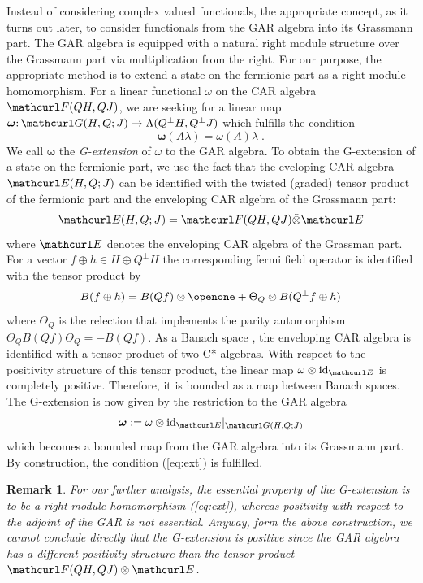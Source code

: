 \documentclass[pra,twoside,amsmath,amsfonts,amssymb,superscriptaddress,showpacs]{revtex4}
\newtheorem{rem}[thm]{Remark}
\def\8#1{{\rm #1}}
\def\9#1{{\mathcurl #1}}
\def\bS#1{{\boldsymbol #1}}
\def\I{\openone}
\newcommand{\CAR}[2]{\9F(#1,#2)}
\newcommand{\GR}[2]{\Lambda(#1,#2)}
\newcommand{\GAR}[3]{\9G(#1,#3;#2)}
\newcommand{\ENV}[3]{\9E(#1,#3;#2)}
\begin{document}
Instead of considering complex valued 
functionals, the appropriate concept, as it turns out later,
to consider functionals from the GAR algebra into its Grassmann part. The GAR
algebra is equipped with a natural right module structure over the Grassmann part via multiplication
from the right. For our purpose, the appropriate method is to extend a state on the fermionic part
as a right module homomorphism. For a linear functional $\omega$ on the CAR algebra $\CAR{QH}{QJ}$,
we are seeking for a linear map $\bS\omega\mathpunct:\GAR{H}{J}{Q}\to\GR{Q^\perp H}{Q^\perp J}$
which fulfills the condition
\begin{equation}
\label{eq:ext}
\bS\omega(A\lambda)=\omega(A)\lambda \; .
\end{equation}
We call $\bS\omega$ the {\em G-extension} of $\omega$ to the GAR algebra. To obtain the
G-extension of a state on the fermionic part, we use the fact that the eveloping CAR algebra
$\ENV{H}{J}{Q}$ can be identified with the twisted (graded) tensor product of the fermionic part and
the enveloping CAR algebra of the Grassmann part:
\begin{equation}
\ENV{H}{J}{Q}=\CAR{QH}{QJ}\tilde\otimes\9E
\end{equation}
where $\9E$ denotes the enveloping CAR algebra of the Grassman part. For a vector
$f\oplus h\in H\oplus Q^\perp H$ the corresponding fermi field operator is identified with the
tensor product by
\begin{equation}
B(f\oplus h )=B(Qf)\otimes\I +\Theta_Q\otimes B(Q^\perp f\oplus h)
\end{equation}
where $\Theta_Q$ is the relection that implements the parity automorphism $\Theta_Q
B(Qf)\Theta_Q=-B(Qf)$. As a Banach space , the enveloping CAR algebra is identified with a tensor
product of two C*-algebras. With respect to the positivity structure of this tensor product, the
linear map $\omega\otimes \8{id}_\9E$ is completely positive. Therefore, it is bounded as a map
between Banach spaces. The G-extension is now given by the restriction to the GAR algebra
\begin{equation}
\bS\omega:=\omega\otimes\8{id}_\9E|_{\GAR{H}{J}{Q}}
\end{equation}
which becomes a bounded map from the GAR algebra into its Grassmann part. By construction, the 
condition (\ref{eq:ext}) is fulfilled.

\begin{rem}\em
For our further analysis, the essential property of the G-extension is to be a right module
homomorphism (\ref{eq:ext}), whereas positivity with respect to the adjoint of the GAR is not
essential. Anyway, form the above construction, we cannot conclude directly that the G-extension is
positive since the GAR algebra has a different positivity structure than the tensor product
$\CAR{QH}{QJ}\otimes\9E$. 
\end{rem}
\end{document}
